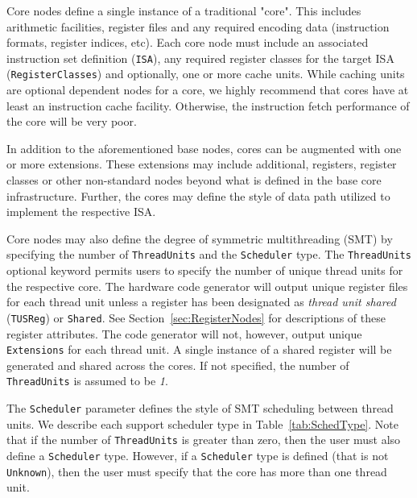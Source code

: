 \documentclass{article}
\begin{document}
Core nodes define a single instance of a traditional "core".  This includes arithmetic facilities, register files 
and any required encoding data (instruction formats, register indices, etc).  Each core node must include 
an associated instruction set definition (\texttt{ISA}), any required register classes for the target ISA (\texttt{RegisterClasses}) 
and optionally, one or more cache units.  While caching units are optional dependent nodes for a core, we 
highly recommend that cores have at least an instruction cache facility.  Otherwise, the instruction fetch 
performance of the core will be very poor.  

In addition to the aforementioned base nodes, cores can be augmented with one or more extensions.  These extensions 
may include additional, registers, register classes or other non-standard nodes beyond what is defined in the base 
core infrastructure.  Further, the cores may define the style of data path utilized to implement the respective ISA.

Core nodes may also define the degree of symmetric multithreading (SMT) by specifying the number of \texttt{ThreadUnits}
and the \texttt{Scheduler} type.
The \texttt{ThreadUnits} optional keyword permits users to specify the number of unique thread units for the respective core.  The hardware 
code generator will output unique register files for each thread unit unless a register has been designated as 
\textit{thread unit shared} (\texttt{TUSReg}) or \texttt{Shared}.  See Section~\ref{sec:RegisterNodes} for descriptions 
of these register attributes.
The code generator will not, however, output unique \texttt{Extensions} for each thread unit.  
A single instance of a shared register will be generated and shared across the cores.  If not specified, the number of 
\texttt{ThreadUnits} is assumed to be \textit{1}.

The \texttt{Scheduler} parameter defines the style of SMT scheduling between thread units.  We describe 
each support scheduler type in Table~\ref{tab:SchedType}.  Note that if the number of \texttt{ThreadUnits} is 
greater than zero, then the user must also define a \texttt{Scheduler} type.  However, if a \texttt{Scheduler} 
type is defined (that is not \texttt{Unknown}), then the user must specify that the core has more than one thread unit.
\end{document}
